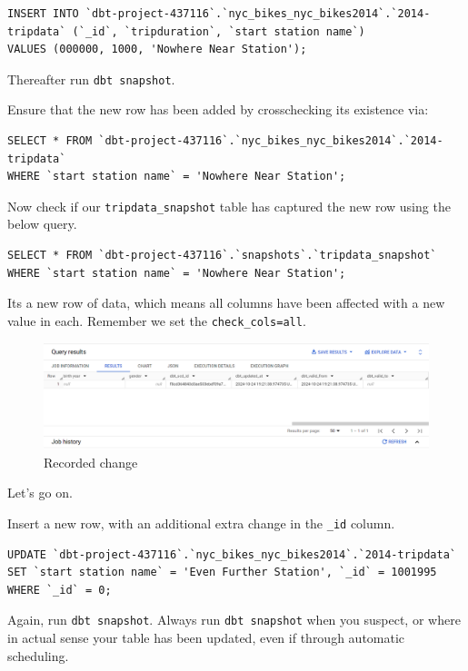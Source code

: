 \documentclass[
]{book}
\begin{document}
\begin{verbatim}
INSERT INTO `dbt-project-437116`.`nyc_bikes_nyc_bikes2014`.`2014-tripdata` (`_id`, `tripduration`, `start station name`) 
VALUES (000000, 1000, 'Nowhere Near Station');
\end{verbatim}

Thereafter run \texttt{dbt\ snapshot}.

Ensure that the new row has been added by crosschecking its existence via:

\begin{verbatim}
SELECT * FROM `dbt-project-437116`.`nyc_bikes_nyc_bikes2014`.`2014-tripdata`
WHERE `start station name` = 'Nowhere Near Station';
\end{verbatim}

Now check if our \texttt{tripdata\_snapshot} table has captured the new row using the below query.

\begin{verbatim}
SELECT * FROM `dbt-project-437116`.`snapshots`.`tripdata_snapshot`
WHERE `start station name` = 'Nowhere Near Station';
\end{verbatim}

Its a new row of data, which means all columns have been affected with a new value in each. Remember we set the \texttt{check\_cols=all}.

\begin{figure}
\centering
\includegraphics{./images/inserted_new_row.png}
\caption{Recorded change}
\end{figure}

Let's go on.

Insert a new row, with an additional extra change in the \texttt{\_id} column.

\begin{verbatim}
UPDATE `dbt-project-437116`.`nyc_bikes_nyc_bikes2014`.`2014-tripdata`
SET `start station name` = 'Even Further Station', `_id` = 1001995
WHERE `_id` = 0;
\end{verbatim}

Again, run \texttt{dbt\ snapshot}. Always run \texttt{dbt\ snapshot} when you suspect, or where in actual sense your table has been updated, even if through automatic scheduling.
\end{document}
